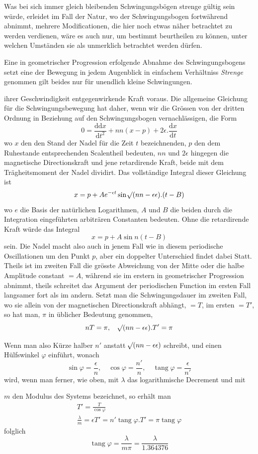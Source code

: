 Was bei sich immer gleich bleibenden Schwingungsbögen strenge gültig sein würde, erleidet im Fall der Natur, wo der Schwingungsbogen fortwährend abnimmt, mehrere Modificationen, die hier noch etwas näher betrachtet zu werden verdienen, wäre es auch nur, um bestimmt beurtheilen zu können, unter welchen Umständen sie als unmerklich betrachtet werden dürfen.

Eine in geometrischer Progression erfolgende Abnahme des Schwingungsbogens setzt eine der Bewegung in jedem Augenblick in einfachem Verhältniss
\expandafter\def\csname HistoricalNoteText395\endcsname{\textit{Strenge} genommen gilt beides nur für unendlich kleine Schwingungen.}%
\par\clearpage
{}
\noindent ihrer Geschwindigkeit entgegenwirkende Kraft voraus. Die allgemeine Gleichung für die Schwingungsbewegung hat daher, wenn wir die Grössen von der dritten Ordnung in Beziehung auf den Schwingungsbogen vernachlässigen, die Form
\[
0=\frac{\mathrm{d}\mathrm{d}x}{\mathrm{d}t^2}+nn(x-p)+2\epsilon.\frac{\mathrm{d}x}{\mathrm{d}t}
\]
wo $x$ den den Stand der Nadel für die Zeit $t$ bezeichnenden, $p$ den dem Ruhestande entsprechenden Scalentheil bedeuten, $nn$ und $2\epsilon$ hingegen die magnetische Directionskraft und jene retardirende Kraft, beide mit dem Trägheitsmoment der Nadel dividirt. Das vollständige Integral dieser Gleichung ist
\[
x=p+Ae^{-\epsilon t}\sin\mathord{{}^{}\!\surd}(nn-\epsilon\epsilon).(t-B)
\]
wo $e$ die Basis der natürlichen Logarithmen, $A$ und $B$ die beiden durch die Integration eingeführten arbiträren Constanten bedeuten. Ohne die retardirende Kraft würde das Integral
\[
x=p+A\sin n(t-B)
\]
sein. Die Nadel macht also auch in jenem Fall wie in diesem periodische Oscillationen um den Punkt $p$, aber ein doppelter Unterschied findet dabei Statt. Theils ist im zweiten Fall die grösste Abweichung von der Mitte oder die halbe Amplitude constant $=A$, während sie im erstern in geometrischer Progression abnimmt, theils schreitet das Argument der periodischen Function im ersten Fall langsamer fort als im andern. Setzt man die Schwingungsdauer im zweiten Fall, wo sie allein von der magnetischen Directionskraft abhängt, $=T$, im ersten $=T'$, so hat man, $\pi$ in üblicher Bedeutung genommen,
\[
nT=\pi,\quad \mathord{{}^{}\!\surd}(nn-\epsilon\epsilon).T'=\pi
\]

Wenn man also Kürze halber $n'$ anstatt $\mathord{{}^{}\!\surd}(nn-\epsilon\epsilon)$ schreibt, und einen Hülfswinkel $\varphi$ einführt, wonach
\[
\sin\varphi=\frac{\epsilon}{n},\quad \cos\varphi=\frac{n'}{n},\quad \operatorname{tang}\varphi=\frac{\epsilon}{n'}
\]
wird, wenn man ferner, wie oben, mit $\lambda$ das logarithmische Decrement und mit
\par\clearpage
{}
\noindent $m$ den Modulus des Systems bezeichnet, so erhält man
\[
\begin{gathered}
T'=\frac{T}{\cos\varphi}\\
\frac{\lambda}{m}=\epsilon T'=n'\operatorname{tang}\varphi.T'=\pi\operatorname{tang}\varphi
\end{gathered}
\]
folglich
\[
\operatorname{tang}\varphi=\frac{\lambda}{m\pi}=\frac{\lambda}{1.364376}
\]

